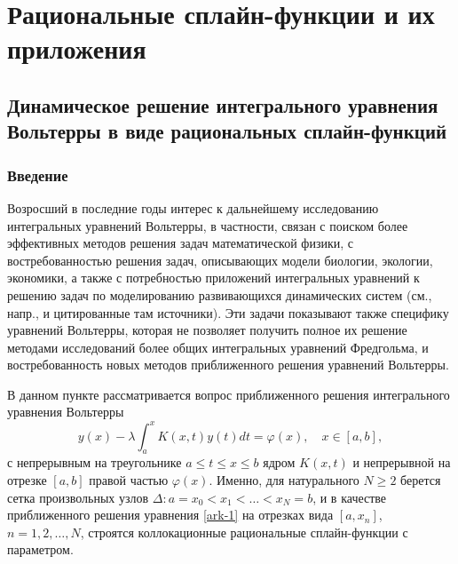 \chapter{Рациональные сплайн-функции и их приложения}

\section{Динамическое решение интегрального уравнения Вольтерры в виде
рациональных сплайн-функций}
%

\subsection{Введение}

Возросший в последние годы интерес к дальнейшему исследованию интегральных уравнений
Вольтерры, в частности, связан с поиском более эффективных методов решения задач
математической физики, с востребованностью решения задач, описывающих модели
биологии, экологии, экономики, а также с потребностью приложений интегральных уравнений
к решению задач по моделированию развивающихся динамических систем (см., напр., \cite{ark-3}
и цитированные там источники). Эти задачи показывают также специфику
уравнений Вольтерры, которая не позволяет получить полное их решение методами
исследований более общих интегральных уравнений Фредгольма, и востребованность новых методов
приближенного решения уравнений Вольтерры.

В данном пункте рассматривается вопрос приближенного решения интегрального уравнения
 Вольтерры
\begin{equation}\label{ark-eq-1}
y(x)-\lambda \int_a^x K(x,t)y(t) dt=\varphi(x),\quad x\in[a,b],
\end{equation}
с непрерывным на треугольнике $a\leqslant t\leqslant x\leqslant b$ ядром $K(x,t)$
и непрерывной на отрезке $[a,b]$ правой частью $\varphi(x)$. Именно, для натурального
$N\geqslant 2$ берется сетка произвольных узлов $\Delta:a=x_0<x_1<\dots <x_N=b$,  и
в качестве приближенного решения уравнения \eqref{ark-1} на отрезках вида $[a,x_n]$,
$n=1,2,\dots,N$, строятся коллокационные рациональные сплайн-функции с параметром.

